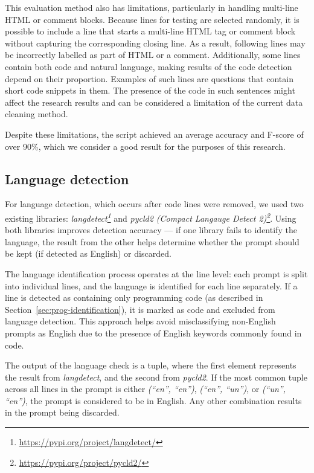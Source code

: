 This evaluation method also has limitations, particularly in handling multi-line HTML or comment blocks. Because lines for testing are selected randomly, it is possible to include a line that starts a multi-line HTML tag or comment block without capturing the corresponding closing line. As a result, following lines may be incorrectly labelled as part of HTML or a comment. Additionally, some lines contain both code and natural language, making results of the code detection depend on their proportion. Examples of such lines are questions that contain short code snippets in them. The presence of the code in such sentences might affect the research results and can be considered a limitation of the current data cleaning method. 

Despite these limitations, the script achieved an average accuracy and F-score of over 90\%, which we consider a good result for the purposes of this research.

\subsection{Language detection}
For language detection, which occurs after code lines were removed, we used two existing libraries: \textit{langdetect\footnote{\url{https://pypi.org/project/langdetect/}}} and \textit{pycld2 (Compact Langauge Detect 2)\footnote{\url{https://pypi.org/project/pycld2/}}}. Using both libraries improves detection accuracy --- if one library fails to identify the language, the result from the other helps determine whether the prompt should be kept (if detected as English) or discarded.

The language identification process operates at the line level: each prompt is split into individual lines, and the language is identified for each line separately. If a line is detected as containing only programming code (as described in Section~\ref{sec:prog-identification}), it is marked as code and excluded from language detection. This approach helps avoid misclassifying non-English prompts as English due to the presence of English keywords commonly found in code.

The output of the language check is a tuple, where the first element represents the result from \textit{langdetect}, and the second from \textit{pycld2}. If the most common tuple across all lines in the prompt is either \textit{(``en'', ``en'')}, \textit{(``en'', ``un'')}, or \textit{(``un'', ``en'')}, the prompt is considered to be in English. Any other combination results in the prompt being discarded.



